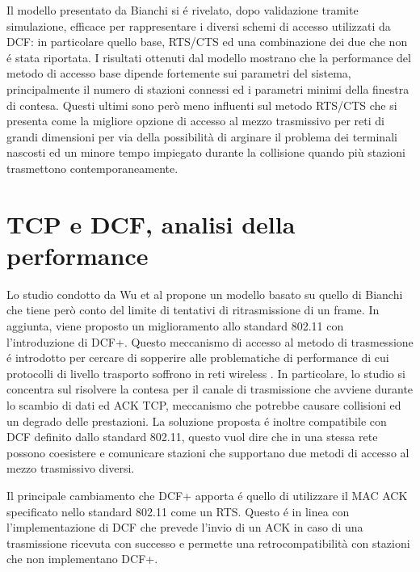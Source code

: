 Il modello presentato da Bianchi si \'e rivelato, dopo validazione tramite simulazione, efficace per rappresentare i diversi schemi di accesso utilizzati da DCF: in particolare quello base, RTS/CTS ed una combinazione dei due che non \'e stata riportata.
I risultati ottenuti dal modello mostrano che la performance del metodo di accesso base dipende fortemente sui parametri del sistema, principalmente il numero di stazioni connessi ed i parametri minimi della finestra di contesa.
Questi ultimi sono per\`o meno influenti sul metodo RTS/CTS che si presenta come la migliore opzione di accesso al mezzo trasmissivo per reti di grandi dimensioni per via della possibilit\`a di arginare il problema dei terminali nascosti ed un minore tempo impiegato durante la collisione quando pi\`u stazioni trasmettono contemporaneamente.

\newpage

\section{TCP e DCF, analisi della performance }

Lo studio condotto da Wu et al \cite{wu2002performance} propone un modello basato su quello di Bianchi che tiene per\`o conto del limite di tentativi di ritrasmissione di un frame.
In aggiunta, viene proposto un miglioramento allo standard 802.11 con l'introduzione di DCF+.
Questo meccanismo di accesso al metodo di trasmessione \'e introdotto per cercare di sopperire alle problematiche di performance di cui protocolli di livello trasporto soffrono in reti wireless \cite{xylomenos1999tcp}.
In particolare, lo studio si concentra sul risolvere la contesa per il canale di trasmissione che avviene durante lo scambio di dati ed ACK TCP, meccanismo che potrebbe causare collisioni ed un degrado delle prestazioni.
La soluzione proposta \'e inoltre compatibile con DCF definito dallo standard 802.11, questo vuol dire che in una stessa rete possono coesistere e comunicare stazioni che supportano due metodi di accesso al mezzo trasmissivo diversi.

Il principale cambiamento che DCF+ apporta \'e quello di utilizzare il MAC ACK specificato nello standard 802.11 come un RTS.
Questo \'e in linea con l'implementazione di DCF che prevede l'invio di un ACK in caso di una trasmissione ricevuta con successo e permette una retrocompatibilit\`a con stazioni che non implementano DCF+.

